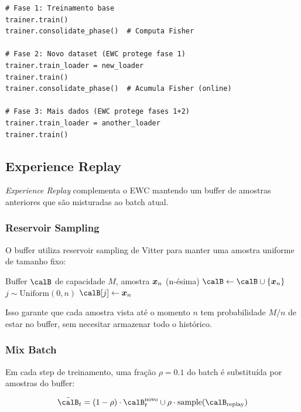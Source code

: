 \begin{lstlisting}[caption={Uso de EWC no treinamento.}]
# Fase 1: Treinamento base
trainer.train()
trainer.consolidate_phase()  # Computa Fisher

# Fase 2: Novo dataset (EWC protege fase 1)
trainer.train_loader = new_loader
trainer.train()
trainer.consolidate_phase()  # Acumula Fisher (online)

# Fase 3: Mais dados (EWC protege fases 1+2)
trainer.train_loader = another_loader
trainer.train()
\end{lstlisting}

\subsection{Experience Replay}
\label{sec:replay}

\textit{Experience Replay} complementa o EWC mantendo um buffer de
amostras anteriores que s\~ao misturadas ao batch atual.

\subsubsection{Reservoir Sampling}

O buffer utiliza reservoir sampling de Vitter \cite{vitter1985reservoir}
para manter uma amostra uniforme de tamanho fixo:

\begin{algorithm}[H]
\caption{Reservoir Sampling}
\begin{algorithmic}[1]
\REQUIRE Buffer $\calB$ de capacidade $M$, amostra $\bm{x}_n$ (n-\'esima)
    \STATE $\calB \leftarrow \calB \cup \{\bx_n\}$
\ELSE
    \STATE $j \sim \text{Uniform}(0, n)$
        \STATE $\calB[j] \leftarrow \bx_n$
    \ENDIF
\ENDIF
\end{algorithmic}
\end{algorithm}

Isso garante que cada amostra vista at\'e o momento $n$ tem probabilidade
$M/n$ de estar no buffer, sem necesitar armazenar todo o hist\'orico.

\subsubsection{Mix Batch}

Em cada step de treinamento, uma fra\c{c}\~ao $\rho = 0.1$ do batch
\'e substitu\'ida por amostras do buffer:

\begin{equation}
    \tilde{\calB}_t = (1 - \rho) \cdot \calB_t^{\text{novo}} \cup \rho \cdot \text{sample}(\calB_{\text{replay}})
\end{equation}

